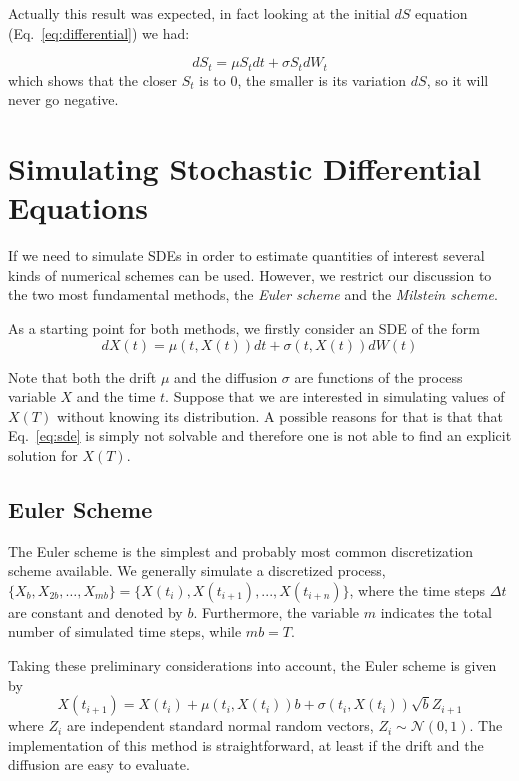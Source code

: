 Actually this result was expected, in fact looking at the initial \(dS\) equation (Eq.~\ref{eq:differential}) we had:

\begin{equation}
dS_t = \mu S_tdt + \sigma S_t dW_t
\end{equation}
which shows that the closer \(S_t\) is to 0, the smaller is its variation \(dS\), so it will never go negative.

\section {Simulating Stochastic Differential Equations}
If we need to simulate SDEs in order to estimate quantities of interest several kinds of numerical schemes can be used. However, we restrict our discussion to the two most fundamental methods, the \emph{Euler scheme} and the \emph{Milstein scheme}. 

As a starting point for both methods, we firstly consider an SDE of the form
\begin{equation}
dX(t) = \mu(t, X(t))dt + \sigma(t, X(t)) dW (t)
\label{eq:sde}
\end{equation}

Note that both the drift $\mu$ and the diffusion $\sigma$ are functions of the process variable $X$ and the time $t$. Suppose that we are interested in simulating values of $X(T)$ without knowing its distribution. A possible reasons for that is that that Eq.~\ref{eq:sde} is simply not solvable and therefore one is not able to find an explicit solution for $X(T)$.


\subsection{Euler Scheme}
The Euler scheme is the simplest and probably most common discretization scheme available. We generally simulate a discretized process, $\{X_b, X_{2b},\ldots, X_{mb}\} = \{X(t_i), X(t_{i+1}),...,X(t_{i+n})\}$, where the time steps $\Delta t$ are constant and denoted by $b$. Furthermore, the variable $m$ indicates the total number of simulated time steps, while $mb = T$.

Taking these preliminary considerations into account, the Euler scheme is given by
\begin{equation}
X(t_{i+1}) = X(t_i) + \mu(t_i , X(t_i))b + \sigma(t_i , X(t_i))\sqrt{b}Z_{i+1}
\label{eq:euler_scheme}
\end{equation}
where $Z_i$ are independent standard normal random vectors, $Z_i ∼ \mathcal{N}(0,1)$. 
The implementation of this method is straightforward, at least if the drift and the diffusion are easy to evaluate.

